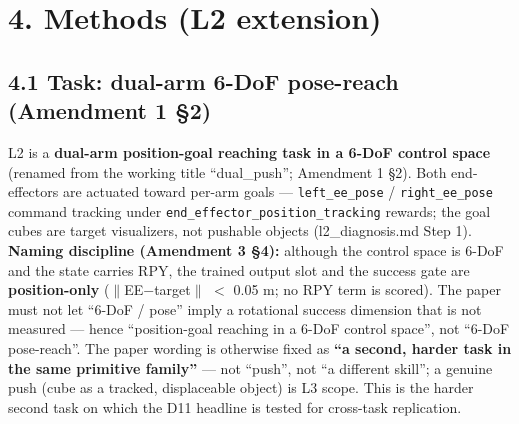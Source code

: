 


\section*{4. Methods (L2 extension)}

\subsection*{4.1 Task: dual-arm 6-DoF pose-reach (Amendment 1 \S2)}

L2 is a \textbf{dual-arm position-goal reaching task in a 6-DoF control space}
(renamed from the working title ``dual\_push''; Amendment 1 \S2). Both
end-effectors are actuated toward per-arm goals --- \texttt{left\_ee\_pose} /
\texttt{right\_ee\_pose} command tracking under \texttt{end\_effector\_position\_tracking}
rewards; the goal cubes are target visualizers, not pushable objects
(l2\_diagnosis.md Step 1). \textbf{Naming discipline (Amendment 3 \S4):} although
the control space is 6-DoF and the state carries RPY, the trained output
slot and the success gate are \textbf{position-only} ($\|$EE$-$target$\|$ $<$ 0.05 m; no
RPY term is scored). The paper must not let ``6-DoF / pose'' imply a
rotational success dimension that is not measured --- hence ``position-goal
reaching in a 6-DoF control space'', not ``6-DoF pose-reach''. The paper
wording is otherwise fixed as \textbf{``a second, harder task in the same
primitive family''} --- not ``push'', not ``a different skill''; a genuine push
(cube as a tracked, displaceable object) is L3 scope. This is the harder
second task on which the D11 headline is tested for cross-task replication.

